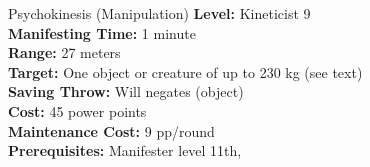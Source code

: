 {Psychokinesis (Manipulation)}
{
	\textbf{Level:}
	Kineticist 9\\
	\textbf{Manifesting Time:}
	1 minute\\
	\textbf{Range:}
	27 meters\\
	\textbf{Target:}
	One object or creature of up to 230 kg (see text)\\
	\textbf{Saving Throw:}
	Will negates (object)\\
	\textbf{Cost:}
	45 power points\\
	\textbf{Maintenance Cost:}
	9 pp/round\\
	\textbf{Prerequisites:}
	Manifester level 11th, \\
}
